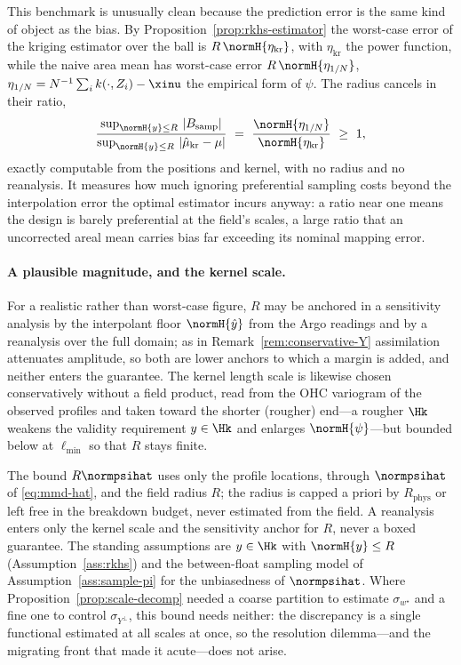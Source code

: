 \begin{remark}
\label{rem:rkhs-benchmark}
This benchmark is unusually clean because the prediction error is the same kind of
object as the bias. By Proposition~\ref{prop:rkhs-estimator} the worst-case error
of the kriging estimator over the ball is $R\,\normH{\eta_{\mathrm{kr}}}$, with
$\eta_{\mathrm{kr}}$ the power function, while the naive area mean has worst-case
error $R\,\normH{\eta_{1/N}}$, $\eta_{1/N}=N^{-1}\sum_i k(\cdot,Z_i)-\xinu$ the
empirical form of $\psi$. The radius cancels in their ratio,
\[
  \frac{\sup_{\normH{y}\le R}\,|B_{\mathrm{samp}}|}
       {\sup_{\normH{y}\le R}\,|\hat\mu_{\mathrm{kr}}-\mu|}
  \ =\ \frac{\normH{\eta_{1/N}}}{\normH{\eta_{\mathrm{kr}}}}\ \ge\ 1 ,
\]
exactly computable from the positions and kernel, with no radius and no reanalysis.
It measures how much ignoring preferential sampling costs beyond the interpolation
error the optimal estimator incurs anyway: a ratio near one means the design is
barely preferential at the field's scales, a large ratio that an uncorrected areal
mean carries bias far exceeding its nominal mapping error.
\end{remark}

\paragraph{A plausible magnitude, and the kernel scale.}
For a realistic rather than worst-case figure, $R$ may be anchored in a
sensitivity analysis by the interpolant floor $\normH{\hat y}$ from the Argo
readings and by a reanalysis over the full domain; as in
Remark~\ref{rem:conservative-Y} assimilation attenuates amplitude, so both are
lower anchors to which a margin is added, and neither enters the guarantee. The
kernel length scale is likewise chosen conservatively without a field product,
read from the OHC variogram of the observed profiles and taken toward the shorter
(rougher) end---a rougher $\Hk$ weakens the validity requirement $y\in\Hk$ and
enlarges $\normH{\psi}$---but bounded below at $\ell_{\min}$ so that $R$ stays
finite.

\begin{remark}
\label{rem:rkhs-ledger}
The bound $R\normpsihat$ uses only the profile locations, through $\normpsihat$ of
\eqref{eq:mmd-hat}, and the field radius $R$; the radius is capped a priori by
$R_{\mathrm{phys}}$ or left free in the breakdown budget, never estimated from the
field. A reanalysis enters only the kernel scale and the sensitivity anchor for
$R$, never a boxed guarantee. The standing assumptions are $y\in\Hk$ with
$\normH{y}\le R$ (Assumption~\ref{ass:rkhs}) and the between-float sampling model
of Assumption~\ref{ass:sample-pi} for the unbiasedness of $\normpsihat$. Where
Proposition~\ref{prop:scale-decomp} needed a coarse partition to estimate
$\sigma_{w^{\star}}$ and a fine one to control $\sigma_{Y^{\perp}}$, this bound
needs neither: the discrepancy is a single functional estimated at all scales at
once, so the resolution dilemma---and the migrating front that made it acute---does
not arise.
\end{remark}


